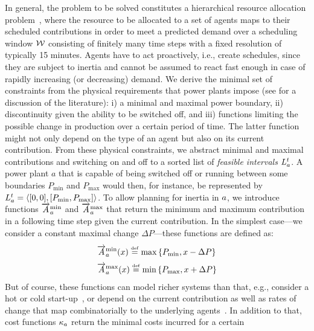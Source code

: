 \documentclass[conference]{IEEEtran}
\begin{document}
In general, the problem to be solved constitutes a hierarchical resource allocation problem~\cite{VanZandt1995},
where the resource to be allocated to a set of agents maps to their scheduled contributions in order
to meet a predicted demand over a scheduling window $\mathcal{W}$ consisting of finitely many time steps with a fixed resolution of typically 15 minutes.
 Agents have to act proactively, i.e., create schedules, since they
are subject to inertia and cannot be assumed to react fast enough in case of rapidly increasing (or decreasing) demand.
We derive the minimal set of constraints from the physical requirements that 
power plants impose (see \cite{SchiendorferSyn2014} for a discussion of the literature):
i) a minimal and maximal power boundary, ii) discontinuity given the ability to be switched off, and 
iii) functions limiting the possible change in production over a certain period of time.
The latter function
might not only depend on the type of an agent but also on its current contribution. 
From these physical constraints, we abstract minimal and maximal contributions
and switching on and off to a sorted list of \emph{feasible intervals} $L^{t}_{a}$.
A power plant $a$ that is capable of being switched off or running between some boundaries
$P_{\mathrm{min}}$ and $P_{\mathrm{max}}$ would then, for instance, be represented by 
$L^{t}_{a} = \langle [0,0], [P_{\mathrm{min}}, P_{\mathrm{max}}] \rangle$.
To allow planning for inertia in $a$, we introduce functions $\overrightarrow{A}^{\mathrm{min}}_{a}$ and
$\overrightarrow{A}^{\mathrm{max}}_{a}$ that return the minimum and maximum contribution in a following time step
given the current contribution. In the simplest case---we consider a constant maximal change $\Delta P$---these 
functions are defined as:
%
		\begin{align*}
		\label{eq:changeInContribution}
		&\ChangeSpeedMin\AnAgent(x) \overset{\underset{\mathrm{def}}{}}{=} \operatorname{max}\left\{P_{\mathrm{min}}, x - \Delta P\right\}\\
		&\ChangeSpeedMax\AnAgent(x) \overset{\underset{\mathrm{def}}{}}{=} \operatorname{min}\left\{P_{\mathrm{max}}, x + \Delta P\right\}
		\end{align*}
%
But of course, these functions can model richer systems than that, e.g., consider a hot or cold start-up~\cite{SchiendorferSyn2014}, or
depend on the current contribution as well as rates of change that map combinatorially to the underlying agents~\cite{Schiendorfer2014}. In addition to that,
cost functions $\kappa_{a}$ return the minimal costs incurred for a certain
\end{document}

